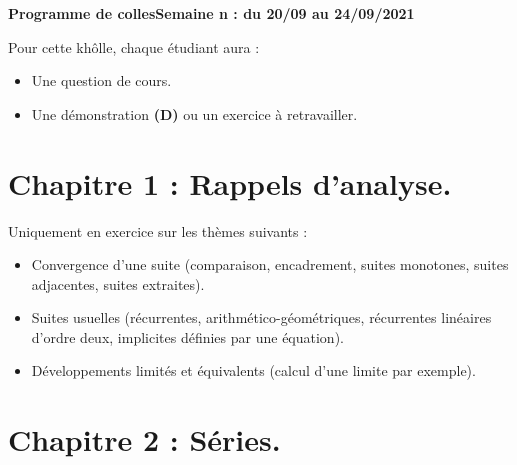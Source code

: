 \documentclass[twoside,a4paper,french,10pt]{VcCours}
\begin{document}

\begin{center}
\large\bf
Programme de collesSemaine n : du 20/09 au 24/09/2021
\end{center}
\separationTitre


Pour cette khôlle, chaque étudiant aura :
\begin{itemize}
\item Une question de cours.
\item Une démonstration \textbf{(D)} ou un exercice à retravailler.
\end{itemize}


\medskip 
\section*{Chapitre 1 : Rappels d'analyse.}

Uniquement en exercice sur les thèmes suivants : 

\begin{itemize}
\item Convergence d'une suite (comparaison, encadrement, suites monotones, suites adjacentes, suites extraites).
\item Suites usuelles (récurrentes, arithmético-géométriques, récurrentes linéaires d'ordre deux, implicites définies par une équation).
\item Développements limités et équivalents (calcul d'une limite par exemple).
\end{itemize}


\section*{Chapitre 2 : Séries.}
\end{document}
